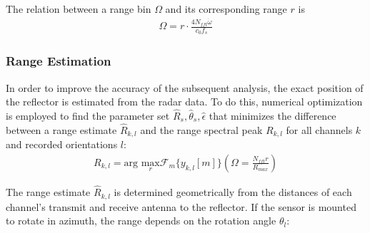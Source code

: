 The relation between a range bin $\Omega$ and its corresponding range $r$ is
\begin{align}
    \Omega = r \cdot \frac{4N_{fft}\dot\omega}{c_0f_s}
\end{align}

\subsubsection*{Range Estimation}

In order to improve the accuracy of the subsequent analysis, the exact position of the reflector is estimated from the radar data.
To do this, numerical optimization is employed to find the parameter set $\hat R_s, \hat \theta_s, \hat \epsilon$ that minimizes the difference between
a range estimate $\hat R_{k,l}$ and the range spectral peak $R_{k,l}$ for all channels $k$ and recorded orientations $l$:
\begin{align}
    R_{k,l} = \text{arg } \underset{r}{\text{max}}\mathcal{F}_m\{y_{k,l}[m]\}\left(\Omega = \frac{N_{fft}r}{R_{max}}\right)
\end{align}

The range estimate $\hat R_{k,l}$ is determined geometrically from the distances of each channel's
transmit and receive antenna to the reflector. If the sensor is mounted to rotate in azimuth,
the range depends on the rotation angle $\theta_l $:

